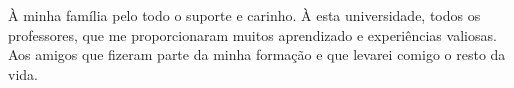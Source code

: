 À minha família pelo todo o suporte e carinho.
À esta universidade, todos os professores, que me proporcionaram muitos aprendizado e experiências valiosas.
Aos amigos que fizeram parte da minha formação e que levarei comigo o resto da vida.